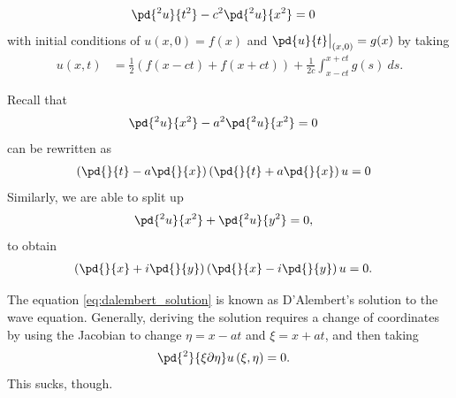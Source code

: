 \documentclass[10pt]{mypackage}
\begin{document}
\begin{align*}
  \pd{^2u}{t^2} - c^2 \pd{^2u}{x^2}&= 0
\end{align*}
with initial conditions of $u\left( x,0 \right) = f(x)$ and $\pd{u}{t}\bigr\vert_{(x,0)} = g(x)$ by taking
\begin{align*}
  u\left( x,t \right) &= \frac{1}{2}\left( f\left( x-ct \right) + f\left( x+ct \right) \right) + \frac{1}{2c} \int_{x-ct}^{x+ct} g(s)\:ds.\label{eq:dalembert_solution}\tag{\textdagger}
\end{align*}
\begin{example}
  Recall that
  \begin{align*}
    \pd{^2u}{x^2} - a^2\pd{^2u}{x^2} &= 0
  \end{align*}
  can be rewritten as
  \begin{align*}
    \left( \pd{}{t} - a\pd{}{x} \right) \left( \pd{}{t}+ a\pd{}{x} \right) u &= 0
  \end{align*}
  Similarly, we are able to split up
  \begin{align*}
    \pd{^2u}{x^2} + \pd{^2u}{y^2} &= 0,
  \end{align*}
  to obtain
  \begin{align*}
    \left( \pd{}{x} + i \pd{}{y} \right)\left( \pd{}{x} - i \pd{}{y} \right) u &= 0.
  \end{align*}
\end{example}
The equation \eqref{eq:dalembert_solution} is known as D'Alembert's solution to the wave equation. Generally, deriving the solution requires a change of coordinates by using the Jacobian to change $\eta = x - at$ and $\xi = x + at$, and then taking
\begin{align*}
  \pd{^2}{\xi\partial\eta }u\left( \xi,\eta \right) &= 0.
\end{align*}
This sucks, though.\newline
\end{document}
